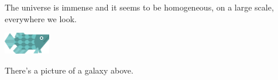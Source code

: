 \documentclass{article}
\begin{document}
The universe is immense and it seems to be homogeneous, 
on a large scale, everywhere we look.

\includegraphics[width=2cm]{fish_360.png}

There's a picture of a galaxy above.
\end{document}
